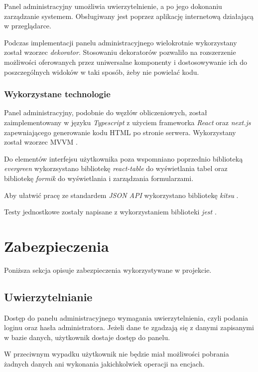 \documentclass[a4paper,11pt,twoside]{report}
\theoremstyle{definition}
\begin{document}
Panel administracyjny umożliwia uwierzytelnienie, a po jego dokonaniu zarządzanie systemem. Obsługiwany jest poprzez aplikację internetową działającą w przeglądarce.

Podczas implementacji panelu administracyjnego wielokrotnie wykorzystany został wzorzec \textit{dekorator}. Stosowaniu dekoratorów pozwaliło na rozszerzenie możliwości oferowanych przez uniwersalne komponenty i dostosowywanie ich do poszczególnych widoków w taki sposób, żeby nie powielać kodu.


\subsubsection{Wykorzystane technologie}
Panel administracyjny, podobnie do węzłów obliczeniowych, został zaimplementowany w języku \textit{Typescript} \cite{typescript} z użyciem frameworka \textit{React} \cite{react} oraz \textit{next.js} \cite{next.js} zapewniającego generowanie kodu HTML po stronie serwera. Wykorzystany został wzorzec MVVM \cite{mvvm}.

Do elementów interfejsu użytkownika poza wspomniano poprzednio biblioteką \textit{evergreen} \cite{evergreen} wykorzsystano bibliotekę \textit{react-table} \cite{react-table} do wyświetlania tabel oraz bibliotekę \textit{formik} \cite{formik} do wyświetlania i zarządzania formularzami.

Aby ułatwić pracę ze standardem \textit{JSON API} wykorzystano bibliotekę \textit{kitsu} \cite{kitsu}.

Testy jednostkowe zostały napisane z wykorzystaniem biblioteki \textit{jest} \cite{jest}.


\section{Zabezpieczenia}

Poniższa sekcja opisuje zabezpieczenia wykorzystywane w projekcie.

\subsection{Uwierzytelnianie} 

Dostęp do panelu administracyjnego wymagania uwierzytelnienia, czyli podania loginu oraz hasła administratora. Jeżeli dane te zgadzają się z danymi zapisanymi w bazie danych, użytkownik dostaje dostęp do panelu.

W przeciwnym wypadku użytkownik nie będzie miał możliwości pobrania żadnych danych ani wykonania jakichkolwiek operacji na encjach.
\end{document}
